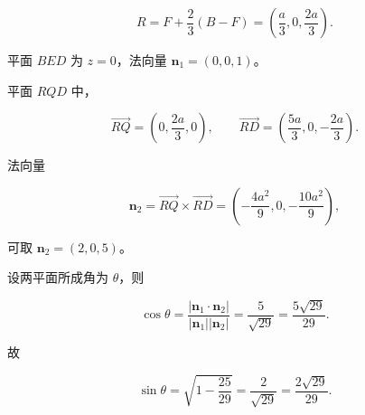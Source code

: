 \begin{answer}
\nopagebreak[4]
\[R=F+\frac23(B-F)
=\left(\frac a3,0,\frac{2a}3\right).\]

平面 $BED$ 为 $z=0$，法向量 $\boldsymbol n_1=(0,0,1)$。

平面 $RQD$ 中，

\nopagebreak[4]
\[\overrightarrow{RQ}=\left(0,\frac{2a}3,0\right),\qquad
\overrightarrow{RD}=\left(\frac{5a}3,0,-\frac{2a}3\right).\]

法向量

\nopagebreak[4]
\[\boldsymbol n_2=\overrightarrow{RQ}\times\overrightarrow{RD}
=\left(-\frac{4a^2}9,0,-\frac{10a^2}9\right),\]

可取 $\boldsymbol n_2=(2,0,5)$。

设两平面所成角为 $\theta$，则

\nopagebreak[4]
\[\cos\theta=\frac{|\boldsymbol n_1\cdot\boldsymbol n_2|}{|\boldsymbol n_1||\boldsymbol n_2|}
=\frac5{\sqrt{29}}=\frac{5\sqrt{29}}{29}.\]

故

\nopagebreak[4]
\[\sin\theta=\sqrt{1-\frac{25}{29}}=\frac2{\sqrt{29}}
=\frac{2\sqrt{29}}{29}.\]


\end{answer}
